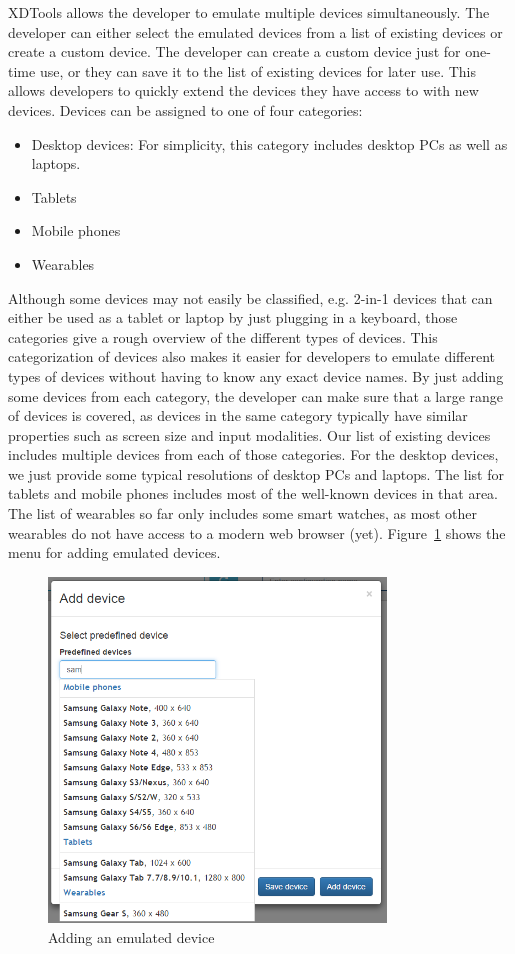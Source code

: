 XDTools allows the developer to emulate multiple devices simultaneously. The developer can either select the emulated devices from a list of existing devices or create a custom device. The developer can create a custom device just for one-time use, or they can save it to the list of existing devices for later use. This allows developers to quickly extend the devices they have access to with new devices. Devices can be assigned to one of four categories:
\begin{itemize}
	\item Desktop devices: For simplicity, this category includes desktop PCs as well as laptops.
	\item Tablets
	\item Mobile phones
	\item Wearables
\end{itemize}
Although some devices may not easily be classified, e.g. 2-in-1 devices that can either be used as a tablet or laptop by just plugging in a keyboard, those categories give a rough overview of the different types of devices. This categorization of devices also makes it easier for developers to emulate different types of devices without having to know any exact device names. By just adding some devices from each category, the developer can make sure that a large range of devices is covered, as devices in the same category typically have similar properties such as screen size and input modalities. Our list of existing devices includes multiple devices from each of those categories. For the desktop devices, we just provide some typical resolutions of desktop PCs and laptops. The list for tablets and mobile phones includes most of the well-known devices in that area. The list of wearables so far only includes some smart watches, as most other wearables do not have access to a modern web browser (yet). Figure~\ref{fig:adding_emulated} shows the menu for adding emulated devices.

\begin{figure}[H]
  \centering
    \includegraphics[width=0.8\textwidth]{images/screenshots/adding_device_predefined.png}
	\caption[Screenshot: Adding emulated devices]{Adding an emulated device}
	\label{fig:adding_emulated}
\end{figure}

